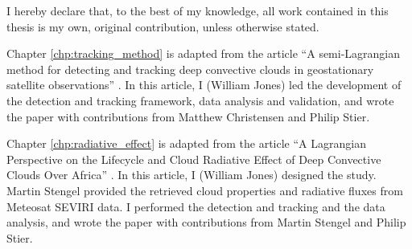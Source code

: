 \begin{originality}

I hereby declare that, to the best of my knowledge, all work contained in this thesis is my own, original contribution, unless otherwise stated.

Chapter \ref{chp:tracking_method} is adapted from the article ``A semi-Lagrangian method for detecting and tracking deep convective clouds in geostationary satellite observations'' \citep{jones_semi-lagrangian_2023}. In this article, I (William Jones) led the development of the detection and tracking framework, data analysis and validation, and wrote the paper with contributions from Matthew Christensen and Philip Stier.

Chapter \ref{chp:radiative_effect} is adapted from the article ``A Lagrangian Perspective on the Lifecycle and Cloud Radiative Effect of Deep Convective Clouds Over Africa'' \citep{jones_lagrangian_2023}. In this article, I (William Jones) designed the study. Martin Stengel provided the retrieved cloud properties and radiative fluxes from Meteosat SEVIRI data. I performed the detection and tracking and the data analysis, and wrote the paper with contributions from Martin Stengel and Philip Stier.

\end{originality}
